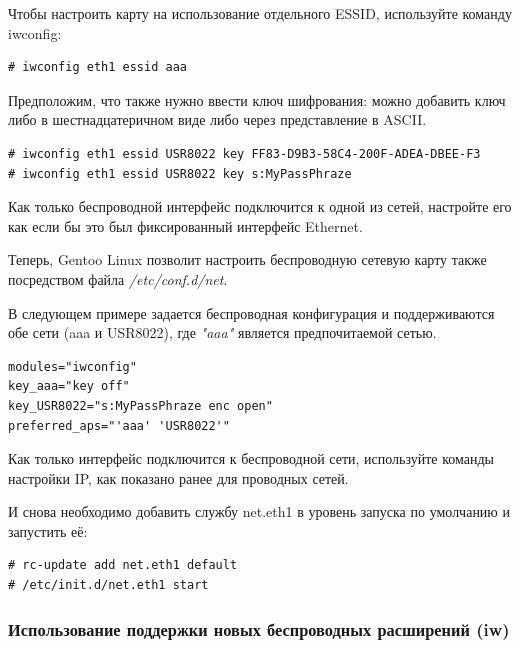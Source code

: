 \documentclass[10pt]{book}
\begin{document}
Чтобы настроить карту на использование отдельного ESSID, используйте команду iwconfig:

\begin{tcolorbox}
\begin{lstlisting}
# iwconfig eth1 essid aaa
\end{lstlisting}
\end{tcolorbox}

Предположим, что также нужно ввести ключ шифрования: можно добавить ключ либо в шестнадцатеричном виде либо через представление в ASCII.

\begin{tcolorbox}
\begin{lstlisting}
# iwconfig eth1 essid USR8022 key FF83-D9B3-58C4-200F-ADEA-DBEE-F3
# iwconfig eth1 essid USR8022 key s:MyPassPhraze
\end{lstlisting}
\end{tcolorbox}

Как только беспроводной интерфейс подключится к одной из сетей, настройте его как если бы это был фиксированный интерфейс Ethernet.

Теперь, Gentoo Linux позволит настроить беспроводную сетевую карту также посредством файла \textit{/etc/conf.d/net}.

В следующем примере задается беспроводная конфигурация и поддерживаются обе сети (aaa и USR8022), где \textit{"aaa"} является предпочитаемой сетью.

\begin{tcolorbox}
\begin{lstlisting}
modules="iwconfig"
key_aaa="key off"
key_USR8022="s:MyPassPhraze enc open"
preferred_aps="'aaa' 'USR8022'"
\end{lstlisting}
\end{tcolorbox}

Как только интерфейс подключится к беспроводной сети, используйте команды настройки IP, как показано ранее для проводных сетей. 

И снова необходимо добавить службу net.eth1 в уровень запуска по умолчанию и запустить её:
\begin{tcolorbox}
\begin{lstlisting}
# rc-update add net.eth1 default
# /etc/init.d/net.eth1 start
\end{lstlisting}
\end{tcolorbox}

\subsubsection{Использование поддержки новых беспроводных расширений (iw)}
\end{document}
